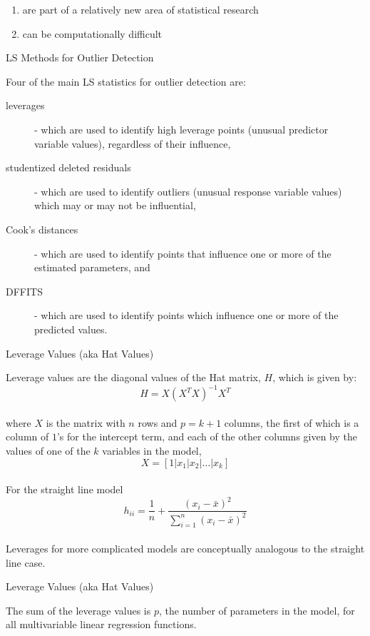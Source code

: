 {{\begin{enumerate}
\item are part of a relatively new area of statistical research
\item can be computationally difficult
\end{enumerate}
\newpage
\begin{center}
LS Methods for Outlier Detection
\end{center}
\vspace{0.5in}
Four of the main LS statistics for outlier detection are:
\begin{description}
\item[leverages] - which are used to identify high
leverage points (unusual predictor variable values), regardless of their
influence,
\item[studentized deleted residuals] -  which are used
to identify outliers (unusual response variable values)
which may or may not be influential,
\item[Cook's distances] - which are used to identify points that
influence one or more of the estimated parameters, and
\item[DFFITS] - which are used to identify points which influence
one or more of the predicted values. 
\end{description}
\newpage
\begin{center}
Leverage Values (aka Hat Values)
\end{center}
\vspace{0.5in}
Leverage values are the diagonal values of the Hat matrix, $H$,
which is given by:
\[ H = X(X^TX)^{-1}X^T \] \\
where $X$ is the matrix with $n$ rows and $p = k+1$ columns,
the first of which is a column of $1$'s for the intercept term, and 
each of the other columns given by the values of 
one of the $k$ variables in the model, 
 \[ X = [1 | x_1 | x_2 | \ldots | x_k] \] \\
\vspace{0.5in}
For the straight line model 
\[ h_{ii} = \frac{1}{n} + \frac{(x_i-\bar{x})^2}{\sum_{i=1}^n(x_i-\bar{x})^2} \] \\
\vspace{0.5in}
Leverages for more complicated models are conceptually analogous to the straight line case. 
\newpage
\begin{center}
Leverage Values (aka Hat Values)
\end{center}
\vspace{0.5in}
The sum of the leverage values is $p$, the number of parameters in the model, for all multivariable linear regression functions. \\
}}
